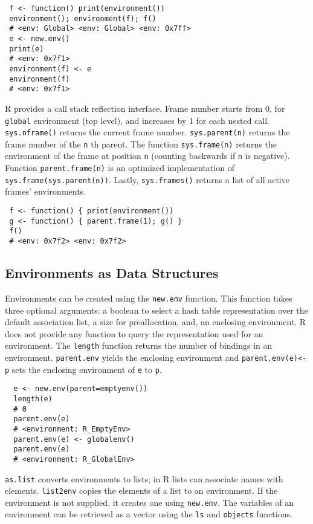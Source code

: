 \documentclass[10pt,review,sigplan,anonymous=true,authorversion=true,nonacm=true]{acmart}
\newcommand{\code}[1]{\lstinline |#1|\xspace}
\newcommand{\newEnv}{\code{new.env}}
\newcommand{\asList}{\code{as.list}}
\newcommand{\listToEnv}{\code{list2env}}
\newcommand{\ls}{\code{ls}}
\newcommand{\objects}{\code{objects}}
\newcommand{\parentEnv}{\code{parent.env}}
\begin{document}
\begin{lstlisting}
 f <- function() print(environment())
 environment(); environment(f); f()
 # <env: Global> <env: Global> <env: 0x7ff>
 e <- new.env()
 print(e)
 # <env: 0x7f1>
 environment(f) <- e
 environment(f)
 # <env: 0x7f1>
\end{lstlisting}

\noindent
R provides a call stack reflection interface. Frame number starts from 0, for
\code{global} environment (top level), and increases by 1 for each nested call.
\code{sys.nframe()} returns the current frame number. \code{sys.parent(n)}
returns the frame number of the \code{n}th parent. The function
\code{sys.frame(n)} returns the environment of the frame at position \code{n}
(counting backwards if \code{n} is negative). Function \code{parent.frame(n)} is
an optimized implementation of \code{sys.frame(sys.parent(n))}. Lastly,
\code{sys.frames()} returns a list of all active frames' environments.

\begin{lstlisting}
 f <- function() { print(environment())
 g <- function() { parent.frame(1); g() }
 f()
 # <env: 0x7f2> <env: 0x7f2>
\end{lstlisting}

\subsection{Environments as Data Structures}

Environments can be created using the \newEnv function. This function takes
three optional arguments: a boolean to select a hash table representation over
the default association list, a size for preallocation, and, an enclosing
environment. R does not provide any function to query the representation used
for an environment. The \code{length} function returns the number of bindings in
an environment. \parentEnv yields the enclosing environment and
\code{parent.env(e)<-p} sets the enclosing environment of \code{e} to \code{p}.

\begin{lstlisting}
  e <- new.env(parent=emptyenv())
  length(e)
  # 0
  parent.env(e)
  # <environment: R_EmptyEnv>
  parent.env(e) <- globalenv()
  parent.env(e)
  # <environment: R_GlobalEnv>
\end{lstlisting}

\asList converts environments to lists; in R lists can associate names with
elements. \listToEnv copies the elements of a list to an environment. If the
environment is not supplied, it creates one using \newEnv. The variables of an
environment can be retrieved as a vector using the \ls and \objects functions.
\end{document}
